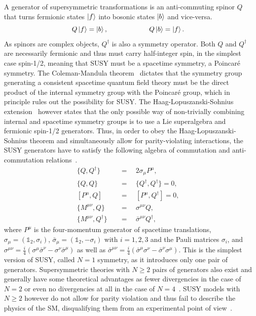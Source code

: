 A generator of supersymmetric transformations is an anti-commuting spinor $Q$ that turns fermionic states $\ket{f}$ into bosonic states $\ket{b}$ and vice-versa.
\begin{equation}
	Q\ket{f} = \ket{b}, \qquad \qquad \qquad Q\ket{b}=\ket{f}.
\end{equation}
As spinors are complex objects, $Q^\dagger$ is also a symmetry operator. Both $Q$ and $Q^\dagger$ are necessarily fermionic and thus must carry half-integer spin, in the simplest case spin-1/2, meaning that SUSY must be a spacetime symmetry, \ie a Poincaré symmetry. The Coleman-Mandula theorem~\cite{PhysRev.159.1251} dictates that the symmetry group generating a consistent spacetime quantum field theory must be the direct product of the internal symmetry group with the Poincaré group, which in principle rules out the possibility for SUSY. The Haag-Lopuszanski-Sohnius extension~\cite{Haag:1974qh} however states that the only possible way of non-trivially combining internal and spacetime symmetry groups is to use a Lie superalgebra and fermionic spin-1/2 generators. Thus, in order to obey the Haag-Lopuszanski-Sohnius theorem and simultaneously allow for parity-violating interactions, the SUSY generators have to satisfy the following algebra of commutation and anti-commutation relations~\cite{Bustamante:2009us}.
\begin{equation}
\begin{split}
	\{ Q,Q^\dagger \} & \quad = \quad  2\sigma_\mu P^\mu,\\
	\{ Q,Q \} &  \quad = \quad \{ Q^\dagger,Q^\dagger \} = 0, \\
	\left[P^\mu,Q \right] &  \quad = \quad \left[ P^\mu,Q^\dagger \right] = 0, \\
	\{ M^{\mu\nu}, Q \} & \quad = \quad \sigma^{\mu\nu} Q,\\
	\{ M^{\mu\nu},Q^\dagger \} & \quad = \quad \bar{\sigma}^{\mu\nu} Q^\dagger,
  \label{eq:commute}
\end{split}
\end{equation}
where $P^\mu$ is the four-momentum generator of spacetime translations, $\sigma_\mu = (\mathbb{1}_2,\sigma_i)$, $\bar{\sigma}_\mu = (\mathbb{1}_2,-\sigma_i)$ with $i=1,2,3$ and the Pauli matrices $\sigma_i$, and $\sigma^{\mu\nu} = \frac{i}{4}(\sigma^\mu\bar{\sigma}^\nu - \sigma^\nu\bar{\sigma}^\mu)$ as well as $\bar{\sigma}^{\mu\nu} = \frac{i}{4}(\bar{\sigma}^\mu\sigma^\nu - \bar{\sigma}^\nu\sigma^\mu)$. This is the simplest version of SUSY, called $N=1$ symmetry, as it introduces only one pair of generators. Supersymmetric theories with $N\geq 2$ pairs of generators also exist and generally have some theoretical advantages as \eg fewer divergencies in the case of $N=2$ or even no divergencies at all in the case of $N=4$~\cite{Bustamante:2009us}. SUSY models with $N\geq 2$ however do not allow for parity violation and thus fail to describe the physics of the SM, disqualifying them from an experimental point of view~\cite{Bustamante:2009us}.

